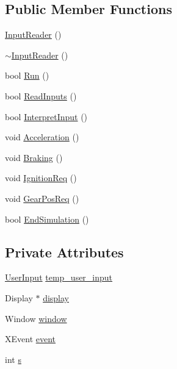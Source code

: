 \subsection*{Public Member Functions}
\begin{DoxyCompactItemize}
\item 
\hyperlink{classInputReader_ae7d7eaec9edd0b8a5e6c5870f23070c3}{Input\+Reader} ()
\item 
\hyperlink{classInputReader_a38875ce3bae818dd0836da36fb7ea891}{$\sim$\+Input\+Reader} ()
\item 
bool \hyperlink{classInputReader_a258e1e58806e172a4339bb2aec9a85f0}{Run} ()
\item 
bool \hyperlink{classInputReader_a541f5d60fa0d9ee786d82f1541485a4a}{Read\+Inputs} ()
\item 
bool \hyperlink{classInputReader_a83a83d74ccb7cd6a29da3b558babaf1c}{Interpret\+Input} ()
\item 
void \hyperlink{classInputReader_a0740495343639fcf0759a1b8fe0fe2e0}{Acceleration} ()
\item 
void \hyperlink{classInputReader_ad35d36c2bac3f4b6bae2d2ad501873cb}{Braking} ()
\item 
void \hyperlink{classInputReader_a0a4c53621f5b7c8e3373341c1f383001}{Ignition\+Req} ()
\item 
void \hyperlink{classInputReader_aec41f6307eb1f4ca8308d4f002ce1cf0}{Gear\+Pos\+Req} ()
\item 
bool \hyperlink{classInputReader_af314d9877257c41a41d937e3ca00c679}{End\+Simulation} ()
\end{DoxyCompactItemize}
\subsection*{Private Attributes}
\begin{DoxyCompactItemize}
\item 
\hyperlink{user__input_8h_a4be483183ef50f2de9cefcb22df23699}{User\+Input} \hyperlink{classInputReader_ad19bb2b46ab677724d4fe3352cab13d6}{temp\+\_\+user\+\_\+input}
\item 
Display $\ast$ \hyperlink{classInputReader_ac8b258254da835100455ef83dd3921df}{display}
\item 
Window \hyperlink{classInputReader_aa27cb19e6c3d1fa1d968b798b5aaa6c5}{window}
\item 
X\+Event \hyperlink{classInputReader_a737042e6b612b74a6444d611297af66f}{event}
\item 
int \hyperlink{classInputReader_af8a0467bf9ab4a7e054eb46b77adf96a}{s}
\end{DoxyCompactItemize}


